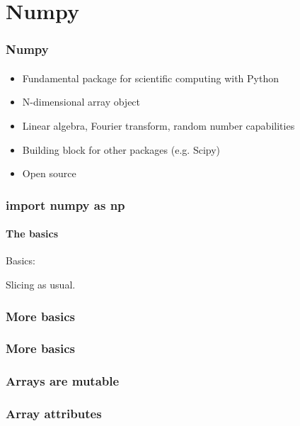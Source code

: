 \section{Numpy} %
\label{sec:numpy}

\begin{frame}\frametitle{Numpy}
    \framesubtitle{}

    \begin{itemize}
        \item Fundamental package for scientific computing with Python
        \item N-dimensional array object
        \pause
        \item Linear algebra, Fourier transform, random number capabilities
        \item Building block for other packages (e.g. Scipy)
        \item Open source
    \end{itemize}

\end{frame}

\begin{frame}\frametitle{import numpy as np}
    \framesubtitle{The basics}

    Basics:


    Slicing as usual.

\end{frame}

\begin{frame}\frametitle{More basics}
    \framesubtitle{}


\end{frame}

\begin{frame}\frametitle{More basics}
    \framesubtitle{}


\end{frame}

\begin{frame}\frametitle{Arrays are mutable}


\end{frame}

\begin{frame}\frametitle{Array attributes}
    \framesubtitle{}


\end{frame}

